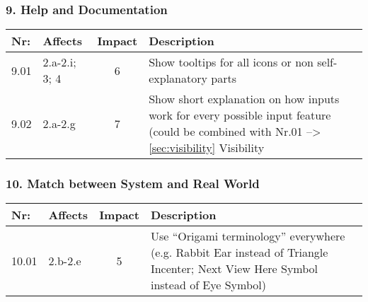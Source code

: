 \subsubsection*{9. Help and Documentation}
        \begin{tabular}{l | p{} | c | p{}}
        Nr: & Affects & Impact & Description \\ \hline
        9.01 & 2.a-2.i; 3; 4 & 6 & Show tooltips for all icons or non self-explanatory parts\\ \hline 
        9.02 & 2.a-2.g & 7 & Show short explanation on how inputs work for every possible input feature (could be combined with Nr.01 --> \ref{sec:visibility} Visibility\\ \hline
        \end{tabular}

\subsubsection*{10. Match between System and Real World}
        \begin{tabular}{l | p{} | c | p{}}
        Nr: & Affects & Impact & Description \\ \hline
        10.01 & 2.b-2.e & 5 & Use ``Origami terminology'' everywhere (e.g. Rabbit Ear instead of Triangle Incenter; Next View Here Symbol instead of Eye Symbol)\\ \hline
        \end{tabular}

